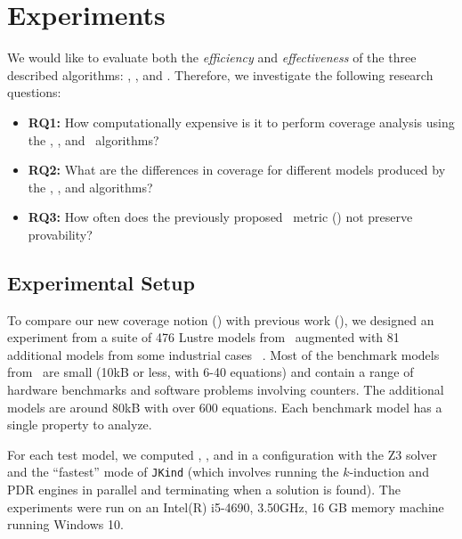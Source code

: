 \section{Experiments}
\label{sec:experiments}

We would like to evaluate both the {\em efficiency} and {\em
  effectiveness} of the three described algorithms: \ucalg, \ucbfalg, and \mustalg. Therefore, we investigate the following research questions:
\begin{itemize}
    \item \textbf{RQ1:} How computationally expensive is it to perform coverage analysis using the \ucalg, \ucbfalg, and \mustalg\ algorithms?
    \item \textbf{RQ2:} What are the differences in coverage for different models produced by the \ucalg, \ucbfalg, and \mustalg algorithms?
    \item \textbf{RQ3:} How often does the previously proposed \nondetcov\ metric (\mustalg) not preserve provability?
\end{itemize}

\subsection{Experimental Setup}

To compare our new coverage notion (\ivccov) with previous work (\nondetcovalt), we designed an experiment from a suite of 476 Lustre models from~\cite{Hagen08:FMCAD} augmented
with 81 additional models from some industrial cases ~\cite{QFCS15:backes,hilt2013}. Most of
the benchmark models from~\cite{Hagen08:FMCAD} are small (10kB or less,
with 6-40 equations) and contain a range of hardware benchmarks and
software problems involving counters. The additional models are around 80kB with over 600 equations. Each benchmark model has a single property to analyze.

For each test model, we computed \ucalg, \ucbfalg, and \mustalg in a configuration with
the Z3 solver and the ``fastest'' mode of \texttt{JKind} (which involves running the $k$-induction and PDR engines
in parallel and terminating when a solution is found). The experiments were run on an
Intel(R) i5-4690, 3.50GHz, 16 GB memory machine running Windows 10.




